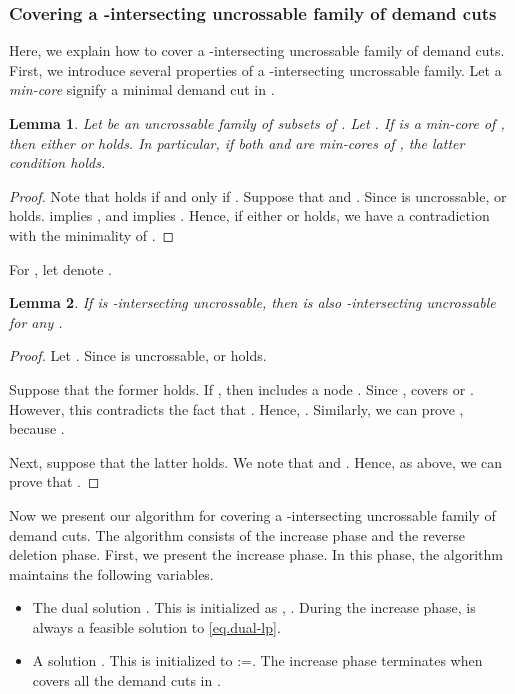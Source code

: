 \documentclass[11pt]{article}
\newtheorem{lemma}{Lemma}
\begin{document}
 \subsubsection{Covering a -intersecting uncrossable family of demand cuts}
\label{sssec.covering}
 
 Here, we explain how to cover a -intersecting uncrossable family  of demand cuts.
 First, we introduce several properties of a -intersecting uncrossable family.
 Let a \emph{min-core} signify a minimal demand cut in .


 
 \begin{lemma}
  \label{lem.disjoint}
 Let  be an uncrossable family of subsets of . Let .
 If  is a min-core of , then 
 either  or  holds.
 In particular, if both  and  are min-cores of ,
  the latter condition holds.
 \end{lemma}
  \begin{proof}
   Note that
    holds if and only if .
 Suppose that  and
 .
 Since  is uncrossable,  or
  holds.
  implies ,
  and  implies .
  Hence, if either 
  or  holds, we have a contradiction with the minimality of .
  \end{proof}

For ,
let  denote .

 \begin{lemma}
  \label{lem.residual}
 If  is -intersecting uncrossable, then
   is also -intersecting uncrossable
 for any .
 \end{lemma}
\begin{proof}
 Let . Since  is uncrossable,  or  holds.

 Suppose that the former holds.
 If , then  includes a node
 . Since ,
  covers  or . However, this contradicts the fact that . Hence, .
 Similarly, we can prove , because
 .

 Next, suppose that the latter holds.
 We note that
  and
 .
 Hence, as above, we can prove that
 .
\end{proof}

Now we present  our algorithm for covering a -intersecting uncrossable family 
  of demand cuts.
  The algorithm consists of the increase phase and the reverse deletion
 phase.
 First, we present the increase phase.
In this phase, the algorithm maintains the following variables.

  \begin{itemize}
   \item  The dual solution .
	  This is initialized as , .
	  During the increase phase,  is always a
	  feasible solution to \eqref{eq.dual-lp}.
   \item  A solution .
	  This is initialized to :=. The increase phase terminates when  covers all the demand cuts in .
  \end{itemize}
\end{document}
